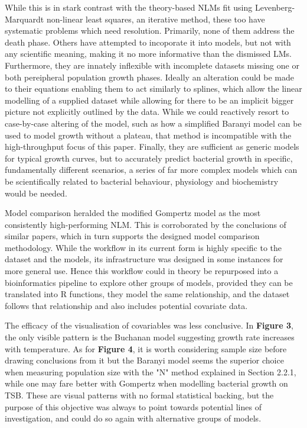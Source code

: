 \documentclass[11pt]{article}
\begin{document}
While this is in stark contrast with the theory-based NLMs fit using Levenberg-Marquardt non-linear least squares, an iterative method, these too have systematic problems which need resolution. Primarily, none of them address the death phase. Others have attempted to incoporate it into models, but not with any scientific meaning, making it no more informative than the dismissed LMs.\parencite{Peleg1997} Furthermore, they are innately inflexible with incomplete datasets missing one or both pereipheral population growth phases. Ideally an alteration could be made to their equations enabling them to act similarly to splines, which allow the linear modelling of a supplied dataset while allowing for there to be an implicit bigger picture not explicitly outlined by the data. While we could reactively resort to case-by-case altering of the model, such as how a simplified Baranyi model can be used to model growth without a plateau, that method is incompatible with the high-throughput focus of this paper.\parencite{Baranyi1993} Finally, they are sufficient as generic models for typical growth curves, but to accurately predict bacterial growth in specific, fundamentally different scenarios, a series of far more complex models which can be scientifically related to bacterial behaviour, physiology and biochemistry would be needed. 

Model comparison heralded the modified Gompertz model as the most consistently high-performing NLM. This is corroborated by the conclusions of similar papers, which in turn supports the designed model comparison methodology.\parencite{Zwietering1990,Buchanan1997} While the workflow in its current form is highly specific to the dataset and the models, its infrastructure was designed in some instances for more general use. Hence this workflow could in theory be repurposed into a bioinformatics pipeline to explore other groups of models, provided they can be translated into R functions, they model the same relationship, and the dataset follows that relationship and also includes potential covariate data.

The efficacy of the visualisation of covariables was less conclusive. In \textbf{Figure 3}, the only visible pattern is the Buchanan model suggesting growth rate increases with temperature. As for \textbf{Figure 4}, it is worth considering sample size before drawing conclusions from it but the Baranyi model seems the superior choice when measuring population size with the "N" method explained in Section 2.2.1, while one may fare better with Gompertz when modelling bacterial growth on TSB. These are visual patterns with no formal statistical backing, but the purpose of this objective was always to point towards potential lines of investigation, and could do so again with alternative groups of models.
\end{document}
